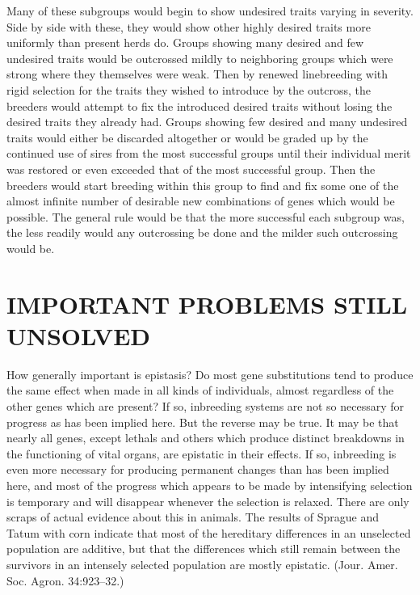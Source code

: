 Many of these subgroups would begin to show undesired traits varying
in severity. Side by side with these, they would show other highly
desired traits more uniformly than present herds do. Groups showing
many desired and few undesired traits would be outcrossed mildly to
neighboring groups which were strong where they themselves were
weak. Then by renewed linebreeding with rigid selection for the traits
they wished to introduce by the outcross, the breeders would attempt to
fix the introduced desired traits without losing the desired traits they
already had. Groups showing few desired and many undesired traits
would either be discarded altogether or would be graded up by the continued
use of sires from the most successful groups until their individual
merit was restored or even exceeded that of the most successful group.
Then the breeders would start breeding within this group to find and
fix some one of the almost infinite number of desirable new combinations
of genes which would be possible. The general rule would be that
the more successful each subgroup was, the less readily would any outcrossing
be done and the milder such outcrossing would be.

\section*{IMPORTANT PROBLEMS STILL UNSOLVED}

How generally important is epistasis? Do most gene substitutions
tend to produce the same effect when made in all kinds of individuals,
almost regardless of the other genes which are present? If so, inbreeding
systems are not so necessary for progress as has been implied here. But
the reverse may be true. It may be that nearly all genes, except lethals
and others which produce distinct breakdowns in the functioning of
vital organs, are epistatic in their effects. If so, inbreeding is even more
necessary for producing permanent changes than has been implied here,
and most of the progress which appears to be made by intensifying
selection is temporary and will disappear whenever the selection is relaxed.
There are only scraps of actual evidence about this in animals.
The results of Sprague and Tatum with corn indicate that most of the
hereditary differences in an unselected population are additive, but
that the differences which still remain between the survivors in an
intensely selected population are mostly epistatic. (Jour. Amer. Soc.
Agron. 34:923--32.)

